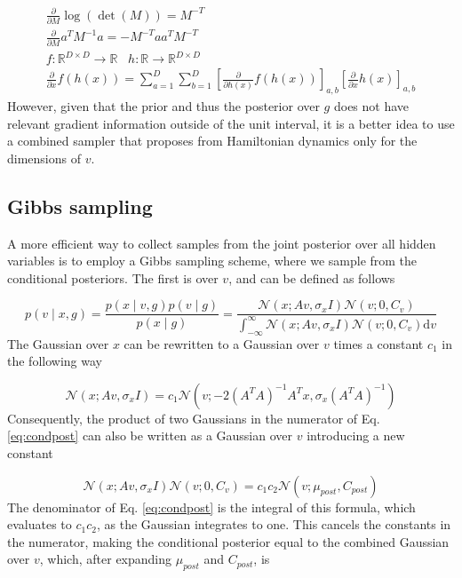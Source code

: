 \documentclass{paper}
\begin{document}
\begin{eqnarray}
\frac{\partial}{\partial M} \log(\det(M))= M^{-T} \label{eq:diffrule1}\\
\frac{\partial}{\partial M} a^T M^{-1} a = - M^{-T} aa^T M^{-T} \label{eq:diffrule2}\\
f: \mathbb{R}^{D \times D} \rightarrow \mathbb{R} \;\;\; h: \mathbb{R} \rightarrow \mathbb{R}^{D \times D} \nonumber\\
\frac{\partial}{\partial x} f(h(x)) = \sum_{a=1}^D \sum_{b=1}^D \left[ \frac{\partial}{\partial h(x)} f(h(x)) \right]_{a,b} \left[ \frac{\partial}{\partial x} h(x) \right]_{a,b} \label{eq:diffrule3}
\end{eqnarray}
%
However, given that the prior and thus the posterior over $g$ does not have relevant gradient information outside of the unit interval, it is a better idea to use a combined sampler that proposes from Hamiltonian dynamics only for the dimensions of $v$.

\subsection{Gibbs sampling}

A more efficient way to collect samples from the joint posterior over all hidden variables is to employ a Gibbs sampling scheme, where we sample from the conditional posteriors. The first is over $v$, and can be defined as follows

\begin{equation} \label{eq:condpost}
p(v \mid x,g) = \frac{p(x \mid v,g) p(v \mid g)}{p(x \mid g)} = \frac{\mathcal{N}(x;Av,\sigma_x I) \mathcal{N}(v;0,C_v)}{\int_{-\infty}^{\infty} \mathcal{N}(x;Av,\sigma_x I) \mathcal{N}(v;0,C_v) \mathrm{d}v}
\end{equation}
%
The Gaussian over $x$ can be rewritten to a Gaussian over $v$ times a constant $c_1$ in the following way

\begin{equation}
\mathcal{N}(x;Av,\sigma_x I) = c_1 \mathcal{N}(v; -2 (A^T A)^{-1} A^T x, \sigma_x (A^T A)^{-1})
\end{equation}
%
Consequently, the product of two Gaussians in the numerator of Eq. \ref{eq:condpost} can also be written as a Gaussian over $v$ introducing a new constant

\begin{equation}
\mathcal{N}(x;Av,\sigma_x I) \mathcal{N}(v;0,C_v) = c_1 c_2 \mathcal{N}(v; \mu_{post},C_{post})
\end{equation}
%
The denominator of Eq. \ref{eq:condpost} is the integral of this formula, which evaluates to $c_1c_2$, as the Gaussian integrates to one. This cancels the constants in the numerator, making the conditional posterior equal to the combined Gaussian over $v$, which, after expanding $\mu_{post}$ and $C_{post}$, is
\end{document}
